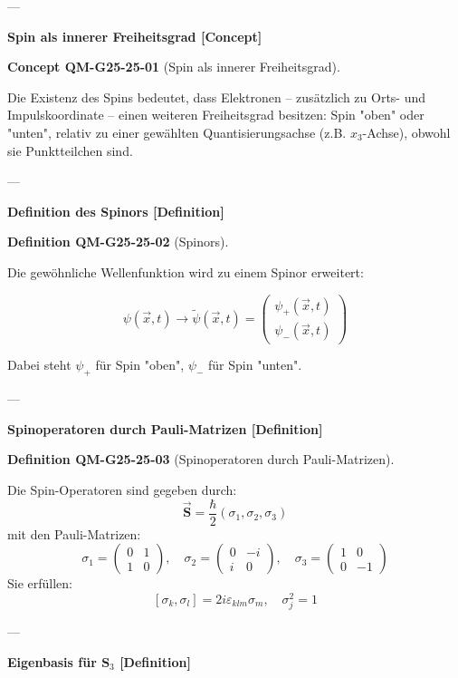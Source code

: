 \documentclass[10pt, letterpaper]{article}
\newcommand{\CustomHeading}[3]{%
  \par\medskip\noindent%
  \textbf{#1 #2} \textnormal{(#3)}.\enskip%
}
\newenvironment{DEF}[2]{\begin{unitbox}\CustomHeading{Definition}{#1}{#2}}{\end{unitbox}}
\newenvironment{CONC}[2]{\begin{unitbox}\CustomHeading{Concept}{#1}{#2}}{\end{unitbox}}
\begin{document}
---

\textbf{Spin als innerer Freiheitsgrad [Concept]}

\begin{CONC}{QM-G25-25-01}{Spin als innerer Freiheitsgrad}
Die Existenz des Spins bedeutet, dass Elektronen – zusätzlich zu Orts- und Impulskoordinate – einen weiteren Freiheitsgrad besitzen: Spin "oben" oder "unten", relativ zu einer gewählten Quantisierungsachse (z.B. \( x_3 \)-Achse), obwohl sie Punktteilchen sind.
\end{CONC}

---

\textbf{Definition des Spinors [Definition]}

\begin{DEF}{QM-G25-25-02}{Spinors}
Die gewöhnliche Wellenfunktion wird zu einem Spinor erweitert:

\[
\psi(\vec{x}, t) \rightarrow \tilde{\psi}(\vec{x}, t)=\begin{pmatrix}\psi_+(\vec{x}, t)\\ \psi_-(\vec{x}, t)\end{pmatrix}
\]

Dabei steht \( \psi_+ \) für Spin "oben", \( \psi_- \) für Spin "unten".
\end{DEF}

---

\textbf{Spinoperatoren durch Pauli-Matrizen [Definition]}

\begin{DEF}{QM-G25-25-03}{Spinoperatoren durch Pauli-Matrizen}
Die Spin-Operatoren sind gegeben durch:
\[
\vec{\mathbf{S}} = \frac{\hbar}{2} (\sigma_1, \sigma_2, \sigma_3)
\]
mit den Pauli-Matrizen:
\[
\sigma_1 = \begin{pmatrix}0 & 1 \\ 1 & 0\end{pmatrix},\quad
\sigma_2 = \begin{pmatrix}0 & -i \\ i & 0\end{pmatrix},\quad
\sigma_3 = \begin{pmatrix}1 & 0 \\ 0 & -1\end{pmatrix}
\]
Sie erfüllen:
\[
[\sigma_k, \sigma_l] = 2i \varepsilon_{klm} \sigma_m,\quad \sigma_j^2 = 1
\]
\end{DEF}

---

\textbf{Eigenbasis für \(\mathbf{S}_3\) [Definition]}
\end{document}
